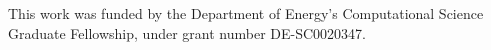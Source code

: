 This work was funded by the Department of Energy's Computational Science Graduate Fellowship, under grant number DE-SC0020347.